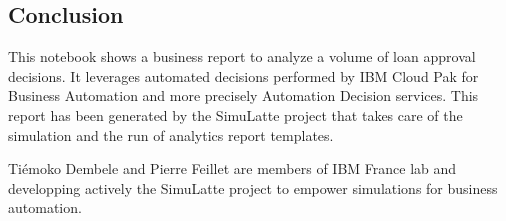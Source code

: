 \documentclass[11pt]{article}
\makeatletter
\newcommand{\boxspacing}{\kern\kvtcb@left@rule\kern\kvtcb@boxsep}
\newcommand{\prompt}[4]{
        {\ttfamily\llap{{\color{#2}[#3]:\hspace{3pt}#4}}\vspace{-\baselineskip}}
    }
\makeatother
\begin{document}
    
    
    \hypertarget{conclusion}{%
\subsection{Conclusion}\label{conclusion}}

This notebook shows a business report to analyze a volume of loan
approval decisions. It leverages automated decisions performed by IBM
Cloud Pak for Business Automation and more precisely Automation Decision
services. This report has been generated by the SimuLatte project that
takes care of the simulation and the run of analytics report templates.

Tiémoko Dembele and Pierre Feillet are members of IBM France lab and
developping actively the SimuLatte project to empower simulations for
business automation.

    \begin{tcolorbox}[breakable, size=fbox, boxrule=1pt, pad at break*=1mm,colback=cellbackground, colframe=cellborder]
\prompt{In}{incolor}{ }{\boxspacing}
\begin{Verbatim}[commandchars=\\\{\}]

\end{Verbatim}
\end{tcolorbox}


    
    
    
\end{document}
